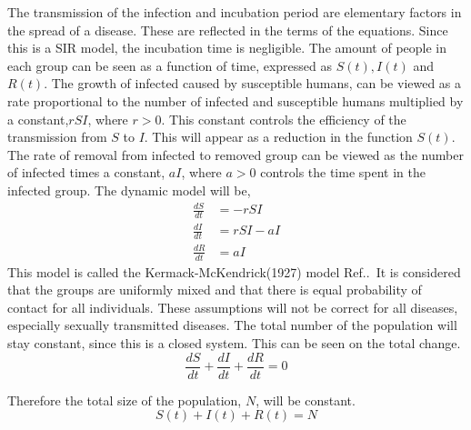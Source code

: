 \documentclass[%
twoside,                 %
final,                   %
chapterprefix=true,      %
open=right               %
10pt]{book}
\begin{document}
The transmission of the infection and incubation period are elementary factors in the spread of a disease. These are reflected in the terms of the equations. Since this is a SIR model, the incubation time is negligible. The amount of people in each group can be seen as a function of time, expressed as $S(t),I(t)$ and $R(t)$. The growth of infected caused by susceptible humans, can be viewed as a rate proportional to the number of infected and susceptible humans multiplied by a constant,$rSI$, where $r>0$. This constant controls the efficiency of the transmission from $S$ to $I$. This will appear as a reduction in the function $S(t)$. The rate of removal from infected to removed group can be viewed as the number of infected times a constant, $aI$, where $a>0$ controls the time spent in the infected group. The dynamic model will be,
\begin{equation} \label{eq:SIR_model}
	\begin{aligned} 
	\frac{dS}{dt} &= -rSI \\ 
	\frac{dI}{dt} &= rSI-aI \\ 
	\frac{dR}{dt} &= aI 
	\end{aligned}
\end{equation}
This model is called the Kermack-McKendrick(1927) model Ref.\cite[p.~320]{murray2002mathematical}.~It is considered that the groups are uniformly mixed and that there is equal probability of contact for all individuals. These assumptions will not be correct for all diseases, especially sexually transmitted diseases. The total number of the population will stay constant, since this is a closed system. This can be seen on the total change.
\begin{equation}
\frac{dS}{dt} + \frac{dI}{dt} + \frac{dR}{dt} = 0
\end{equation}

Therefore the total size of the population, $N$, will be constant. 
\begin{equation} \label{eq:SIR_N}
S(t)+I(t)+R(t) = N
\end{equation}
\end{document}
